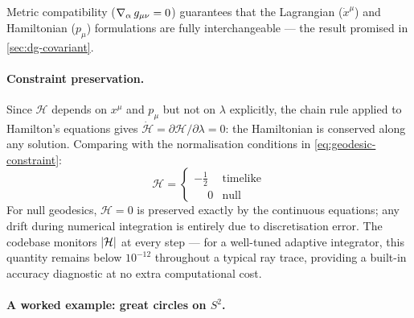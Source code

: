 Metric compatibility ($\nabla_{\alpha}\,g_{\mu\nu} = 0$) guarantees that the
Lagrangian ($\dot{x}^\mu$) and Hamiltonian ($p_\mu$) formulations are fully
interchangeable --- the result promised in \cref{sec:dg-covariant}.

\paragraph{Constraint preservation.}

Since $\mathcal{H}$ depends on $x^\mu$ and $p_\mu$ but not on $\lambda$
explicitly, the chain rule applied to Hamilton's equations gives
$\dot{\mathcal{H}} = \partial\mathcal{H}/\partial\lambda = 0$: the
Hamiltonian is conserved along any solution.  Comparing with the normalisation
conditions in \cref{eq:geodesic-constraint}:
%
\begin{equation}
  \mathcal{H} =
  \begin{cases}
    -\tfrac{1}{2} & \text{timelike} \\
    \phantom{-}0 & \text{null}
  \end{cases}
  \label{eq:hamiltonian-constraint}
\end{equation}
%
For null geodesics, $\mathcal{H} = 0$ is preserved exactly by the continuous
equations; any drift during numerical integration is entirely due to
discretisation error.  The codebase monitors $\left\lvert \mathcal{H} \right\rvert$ at every
step --- for a well-tuned adaptive integrator, this quantity remains below
$10^{-12}$ throughout a typical ray trace, providing a built-in accuracy
diagnostic at no extra computational cost.

\paragraph{A worked example: great circles on $S^2$.}

